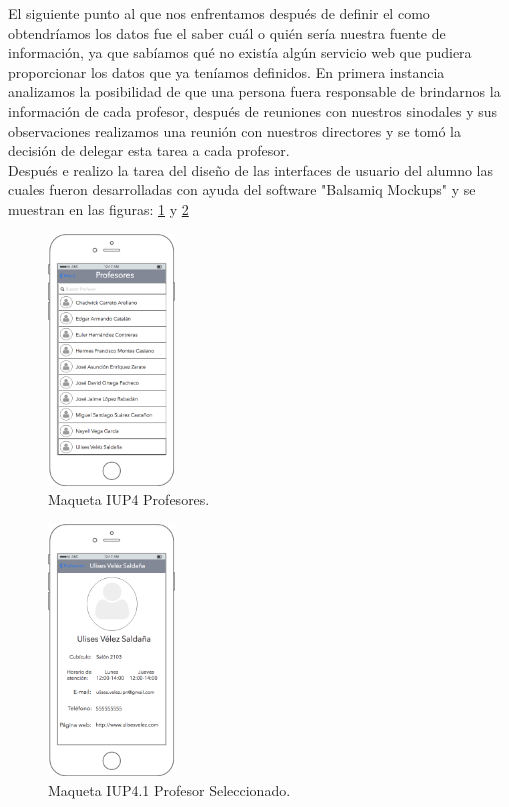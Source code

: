 	 El siguiente punto al que nos enfrentamos después de definir el como obtendríamos los datos fue el saber cuál o quién sería nuestra fuente de información, ya que sabíamos qué no existía algún servicio web que pudiera proporcionar los datos que ya teníamos definidos.  En primera instancia analizamos la posibilidad de que una persona fuera responsable de brindarnos la información de cada profesor, después de reuniones con nuestros sinodales y sus observaciones realizamos una reunión con nuestros directores y se tomó la decisión de delegar esta tarea a cada profesor.\\
	 
	 Después e realizo la tarea del diseño de las interfaces de usuario del alumno las cuales fueron desarrolladas con ayuda del software "Balsamiq Mockups" y se muestran en las figuras: \ref{fig:maquetaprofesor} y \ref{fig:maquetaprofesorSeleccionado}
	 \begin{figure}[h!]
	 	\begin{center}
	 		\includegraphics[width=0.3\textwidth]{images/maqueta/UIP4Profesores.png}
	 		\caption{Maqueta IUP4 Profesores.}
	 		\label{fig:maquetaprofesor}
	 	\end{center}
	 \end{figure}
 \begin{figure}[h!]
 	\begin{center}
 		\includegraphics[width=0.3\textwidth]{images/maqueta/UIP41ProfesorSeleccionado.png}
 		\caption{Maqueta IUP4.1 Profesor Seleccionado.}
 		\label{fig:maquetaprofesorSeleccionado}
 	\end{center}
 \end{figure}
